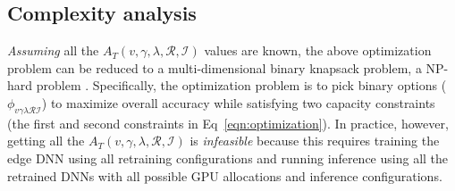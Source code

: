 
\subsection{Complexity analysis}
\label{complexity-analysis}
\emph{Assuming} all the $A_T(v, \gamma, \lambda, \mathcal{R}, \mathcal{I})$ values are known, the above optimization problem can be reduced to a multi-dimensional binary knapsack problem, a NP-hard problem \cite{DBLP:journals/mor/MagazineC84}. 
Specifically, the optimization problem is to pick binary options ($\phi_{v\gamma\lambda\mathcal{R}\mathcal{I}}$) to maximize overall accuracy while satisfying two capacity constraints (the first and second constraints in Eq~\ref{eqn:optimization}). %
In practice, however, getting all the $A_T(v, \gamma, \lambda, \mathcal{R}, \mathcal{I})$ is \emph{infeasible} 
because this requires training the edge DNN using all retraining configurations and running inference using all the retrained DNNs with all possible GPU allocations and inference configurations.%

